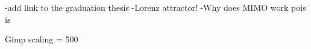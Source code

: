 -add link to the graduation thesis
-Lorenz attractor!
-Why does MIMO work pois is

Gimp scaling = 500 
